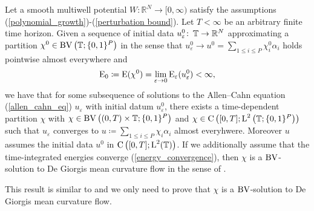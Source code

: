 \begin{theorem}
	\label{convergence_to_de_giorgis_multiphase_mcf}
	Let a smooth multiwell potential $ W \colon \mathbb{ R }^{ N } \to [ 0, 
	\infty ) $ satisfy the assumptions 
	(\ref{polynomial_growth})-(\ref{perturbation bound}). Let $ T < \infty 
	$ be an arbitrary finite time horizon. Given a sequence of initial data 
	$ u_{ \varepsilon }^{ 0 } \colon \operatorname{\mathbb{T}} \to \mathbb{ R }^{ N } $ 
	approximating a partition 
	$ \chi^{ 0 } \in \operatorname{BV} \left( \operatorname{\mathbb{T}} ; \{ 0 , 1 \}^{ P } \right) $ 
	in the sense that 
	$ u_{ \varepsilon }^{ 0 } \to u^{ 0 } =  \sum_{ 1 \leq i \leq P } 
	\chi_{ i }^{ 0 } \alpha_{ i } $ 
	holds pointwise almost everywhere and 
	\begin{equation*} 
		\operatorname{E}_{ 0 } 
		\coloneqq 
		\operatorname{E} ( \chi^{ 0 } ) 
		= 
		\lim_{ \varepsilon \to 0 } 
		\operatorname{E}_{ \varepsilon } ( u_{ \varepsilon }^{ 0 } ) 
		< 
		\infty,
	\end{equation*}
	we have that for 
	some subsequence of solutions to the Allen--Cahn equation
	(\ref{allen_cahn_eq}) $ u_{\varepsilon } $ with initial datum $ u_{ 
		\varepsilon }^{ 0 } $, there exists a time-dependent partition $ \chi $ 
	with 
	$ \chi \in \operatorname{BV} \left( ( 0 , T ) \times \operatorname{\mathbb{T}} ; \{ 0 , 1 \}^{ P } 
	\right) $ and
	$ \chi 
	\in \operatorname{C} \left( [ 0 , T ] ; \operatorname{L}^{ 2 } \left( \operatorname{\mathbb{T}} ;  \{ 0 , 1 
	\}^{ P } \right) \right) $ such that $ u_{ \varepsilon } $ converges to 
	$ u \coloneqq \sum_{ 1 \leq i \leq P } \chi_{ i } \alpha_{ i } $ almost 
	everyhwere. Moreover $ u $ assumes the initial data $ u^{ 0 } $ in $ 
	\operatorname{C} \left( [ 0, T ] ; \operatorname{L}^{ 2 }( \operatorname{\mathbb{T}} ) \right) $. If we 
	additionally assume that the 
	time-integrated energies converge (\ref{energy_convergence}), then $ 
	\chi $ is a $ \operatorname{BV} $-solution to De Giorgis mean curvature flow in the sense 
	of 
	.
\end{theorem} 

This result is similar to  and we only need 
to prove that $ \chi $ is a $ \operatorname{BV} $-solution to De Giorgis mean curvature flow.

